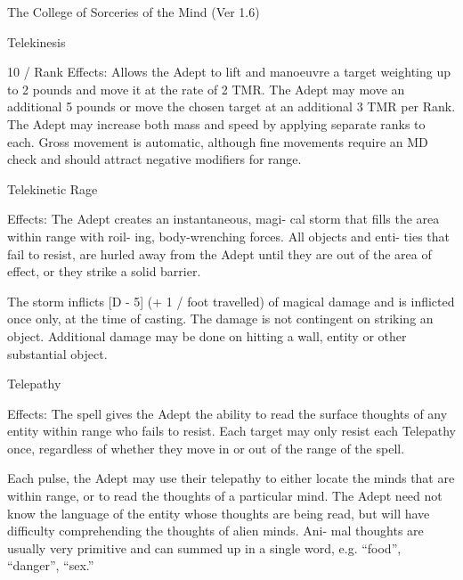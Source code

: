 \begin{Chapter}{The College of Sorceries of the Mind (Ver 1.6)}
\begin{spell}[S-7]{Telekinesis }

10 / Rank 
Effects:  Allows  the  Adept  to  lift  and  manoeuvre  a 
target weighting up to 2 pounds and move it at the 
rate of 2 TMR. The Adept may move an additional 
5 pounds or move the chosen target at an additional 
3  TMR  per  Rank.  The  Adept  may  increase  both 
mass and speed by applying separate ranks to each. 
Gross  movement 
is  automatic,  although  fine 
movements  require  an  MD  check  and  should  attract negative modifiers for range. 

\end{spell}

\begin{spell}[S-8]{Telekinetic Rage }

Effects: The Adept creates an instantaneous, magi-
cal storm that fills the area  within range  with roil-
ing,  body-wrenching  forces.  All  objects  and  enti-
ties  that  fail  to  resist,  are  hurled  away  from  the 
Adept  until  they  are  out  of  the  area  of  effect,  or 
they strike a solid barrier. 

The  storm  inflicts  [D  -  5]  (+  1  /  foot  travelled)  of 
magical  damage  and  is  inflicted  once  only,  at  the 
time  of  casting.  The  damage  is  not  contingent  on 
striking an object. Additional damage may be done 
on hitting a wall, entity or other substantial object. 

\end{spell}

\begin{spell}[S-9]{Telepathy }

Effects:  The  spell  gives  the  Adept  the  ability  to 
read the surface thoughts of any entity within range 
who fails to resist. Each target may only resist each 
Telepathy  once,  regardless  of  whether  they  move 
in or out of the range of the spell. 

Each  pulse,  the  Adept  may  use  their  telepathy  to 
either locate the minds that are within range, or to 
read  the  thoughts  of  a  particular  mind.  The  Adept 
need  not  know  the  language  of  the  entity  whose 
thoughts  are  being  read,  but  will  have  difficulty 
comprehending  the  thoughts  of  alien  minds.  Ani-
mal  thoughts  are  usually  very  primitive  and  can 
summed up in a single word, e.g. “food”, “danger”, 
“sex.” 


\end{spell}
\end{Chapter}
